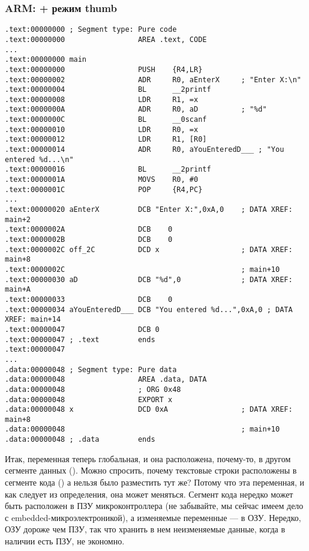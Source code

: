 ﻿%
\subsubsection{ARM: \OptimizingKeil + режим thumb}

\begin{lstlisting}
.text:00000000 ; Segment type: Pure code
.text:00000000                 AREA .text, CODE
...
.text:00000000 main
.text:00000000                 PUSH    {R4,LR}
.text:00000002                 ADR     R0, aEnterX     ; "Enter X:\n"
.text:00000004                 BL      __2printf
.text:00000008                 LDR     R1, =x
.text:0000000A                 ADR     R0, aD          ; "%d"
.text:0000000C                 BL      __0scanf
.text:00000010                 LDR     R0, =x
.text:00000012                 LDR     R1, [R0]
.text:00000014                 ADR     R0, aYouEnteredD___ ; "You entered %d...\n"
.text:00000016                 BL      __2printf
.text:0000001A                 MOVS    R0, #0
.text:0000001C                 POP     {R4,PC}
...
.text:00000020 aEnterX         DCB "Enter X:",0xA,0    ; DATA XREF: main+2
.text:0000002A                 DCB    0
.text:0000002B                 DCB    0
.text:0000002C off_2C          DCD x                   ; DATA XREF: main+8
.text:0000002C                                         ; main+10
.text:00000030 aD              DCB "%d",0              ; DATA XREF: main+A
.text:00000033                 DCB    0
.text:00000034 aYouEnteredD___ DCB "You entered %d...",0xA,0 ; DATA XREF: main+14
.text:00000047                 DCB 0
.text:00000047 ; .text         ends
.text:00000047
...
.data:00000048 ; Segment type: Pure data
.data:00000048                 AREA .data, DATA
.data:00000048                 ; ORG 0x48
.data:00000048                 EXPORT x
.data:00000048 x               DCD 0xA                 ; DATA XREF: main+8
.data:00000048                                         ; main+10
.data:00000048 ; .data         ends
\end{lstlisting}

Итак, переменная  теперь глобальная, и она расположена, почему-то, в другом сегменте данных (). 
Можно спросить, почему текстовые строки расположены в сегменте кода () а  нельзя было разместить
тут же? Потому что эта переменная, и как следует из определения, она может меняться. Сегмент кода нередко может 
быть расположен в ПЗУ микроконтроллера (не забывайте, мы сейчас имеем дело с embedded-микроэлектроникой),
а изменяемые переменные --- в ОЗУ.
Нередко, ОЗУ дороже чем ПЗУ, так что хранить в нем неизменяемые данные, когда в наличии есть ПЗУ, не экономно.

